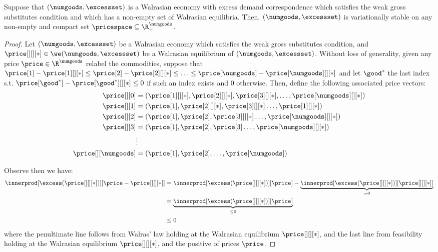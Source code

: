 \begin{lemma}
    Suppose that $(\numgoods, \excessset)$ is a Walrasian economy with excess demand correspondence which satisfies the weak gross substitutes condition and which has a non-empty set of Walrasian equilibria. Then, $(\numgoods, \excessset)$ is variationally stable on any non-empty and compact set $\pricespace \subseteq \R^\numgoods_+$.
\end{lemma}
\begin{proof}
    Let $(\numgoods, \excessset)$ be a Walrasian economy which satisfies the weak gross substitutes condition, and $\price[][][*] \in \we(\numgoods, \excessset)$ be a Walrasian equilibrium of $(\numgoods, \excessset)$. Without loss of generality, given any price $\price \in \R^\numgoods$ relabel the commodities, suppose that $\price[1] - \price[1][][*] \leq \price[2] - \price[2][][*] \leq \hdots \leq \price[\numgoods] - \price[\numgoods][][*]$ and let $\good^*$ the last index s.t. $\price[{\good^*}] - \price[{\good^*}][][*] \leq 0$ if such an index exists and $0$ otherwise. Then, define the following associated price vectors:
    \begin{align*}
        \price[][0] &= (\price[1][][*], \price[2][][*], \price[3][][*], \hdots, \price[\numgoods][][*])\\
        \price[][1] &= (\price[1], \price[2][][*], \price[3][][*] \hdots, \price[1][][*])\\
        \price[][2] &= (\price[1], \price[2], \price[3][][*] \hdots, \price[\numgoods][][*])\\
        \price[][3] &= (\price[1], \price[2], \price[3] \hdots, \price[\numgoods][][*])\\
        &\vdots\\
        \price[][\numgoods] &= (\price[1], \price[2], \hdots, \price[\numgoods])
    \end{align*}


    Observe then we have:
    \begin{align}
        \innerprod[{\excess(\price[][][*])}][{\price - \price[][][*]}] &= \innerprod[{\excess(\price[][][*])}][{\price}] - \underbrace{\innerprod[{\excess(\price[][][*])}][{\price[][][*]}]}_{= 0} \notag\\
        &= \underbrace{\innerprod[{\excess(\price[][][*])}][{\price}]}_{\leq 0} \notag\\
        &\leq 0 \label{eq:wgs_bound_1}
    \end{align}
    where the penultimate line follows from Walras' law holding at the Walrasian equilibrium $\price[][][*]$, and the last line from feasibility holding at the Walrasian equilibrium $\price[][][*]$, and the positive of prices $\price$.


\end{proof}
